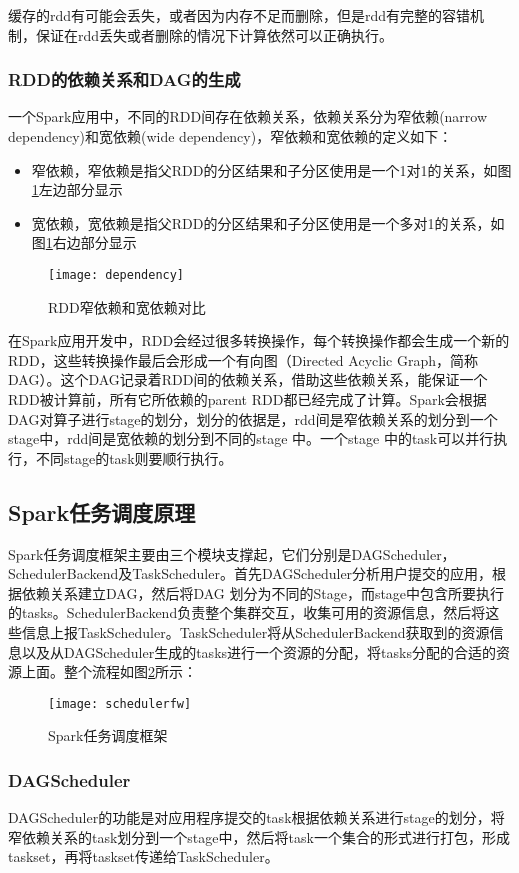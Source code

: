 缓存的rdd有可能会丢失，或者因为内存不足而删除，但是rdd有完整的容错机制，保证在rdd丢失或者删除的情况下计算依然可以正确执行。
\subsubsection{RDD的依赖关系和DAG的生成}
一个Spark应用中，不同的RDD间存在依赖关系，依赖关系分为窄依赖(narrow dependency)和宽依赖(wide dependency)，窄依赖和宽依赖的定义如下：
\begin{itemize}
\item 窄依赖，窄依赖是指父RDD的分区结果和子分区使用是一个1对1的关系，如图\ref{fig:dependency}左边部分显示
\item 宽依赖，宽依赖是指父RDD的分区结果和子分区使用是一个多对1的关系，如图\ref{fig:dependency}右边部分显示
\end{itemize}
\begin{figure}[htp]
\centering
\texttt{[image: dependency]}
\caption{RDD窄依赖和宽依赖对比}
\label{fig:dependency}
\end{figure}
在Spark应用开发中，RDD会经过很多转换操作，每个转换操作都会生成一个新的RDD，这些转换操作最后会形成一个有向图（Directed Acyclic Graph，简称DAG）。这个DAG记录着RDD间的依赖关系，借助这些依赖关系，能保证一个RDD被计算前，所有它所依赖的parent RDD都已经完成了计算。Spark会根据DAG对算子进行stage的划分，划分的依据是，rdd间是窄依赖关系的划分到一个stage中，rdd间是宽依赖的划分到不同的stage 中。一个stage 中的task可以并行执行，不同stage的task则要顺行执行。
\subsection{Spark任务调度原理}
Spark任务调度框架主要由三个模块支撑起，它们分别是DAGScheduler，SchedulerBackend及TaskScheduler。首先DAGScheduler分析用户提交的应用，根据依赖关系建立DAG，然后将DAG 划分为不同的Stage，而stage中包含所要执行的tasks。SchedulerBackend负责整个集群交互，收集可用的资源信息，然后将这些信息上报TaskScheduler。TaskScheduler将从SchedulerBackend获取到的资源信息以及从DAGScheduler生成的tasks进行一个资源的分配，将tasks分配的合适的资源上面。整个流程如图\ref{fig:schedulerfw}所示：
\begin{figure}[htp]
\centering
\texttt{[image: schedulerfw]}
\caption{Spark任务调度框架}
\label{fig:schedulerfw}
\end{figure}
\subsubsection{DAGScheduler}
DAGScheduler的功能是对应用程序提交的task根据依赖关系进行stage的划分，将窄依赖关系的task划分到一个stage中，然后将task一个集合的形式进行打包，形成taskset，再将taskset传递给TaskScheduler。
